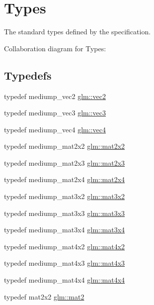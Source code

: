 \hypertarget{group__core__types}{}\section{Types}
\label{group__core__types}


The standard types defined by the specification.  


Collaboration diagram for Types\+:
\subsection*{Typedefs}
\begin{DoxyCompactItemize}
\item 
typedef mediump\+\_\+vec2 \hyperlink{group__core__types_ga66d091b759687504ab01365fbd33a1dd}{glm\+::vec2}
\item 
typedef mediump\+\_\+vec3 \hyperlink{group__core__types_gad45787527c6ff2bd6680867204eb0354}{glm\+::vec3}
\item 
typedef mediump\+\_\+vec4 \hyperlink{group__core__types_gae9c89157f980f7247cdee8bf55787035}{glm\+::vec4}
\item 
typedef mediump\+\_\+mat2x2 \hyperlink{group__core__types_gac35d9aae8d7beaceba6d18f6e26261a4}{glm\+::mat2x2}
\item 
typedef mediump\+\_\+mat2x3 \hyperlink{group__core__types_gad23070b803932f5f3c9d9c2fd4d64895}{glm\+::mat2x3}
\item 
typedef mediump\+\_\+mat2x4 \hyperlink{group__core__types_gaa78542b8bfa06cd48c53dcd0d0a00707}{glm\+::mat2x4}
\item 
typedef mediump\+\_\+mat3x2 \hyperlink{group__core__types_gae38fe62de819d214ac89f1f4df343844}{glm\+::mat3x2}
\item 
typedef mediump\+\_\+mat3x3 \hyperlink{group__core__types_gae01cfe70eb34df727346f82c7c08acd7}{glm\+::mat3x3}
\item 
typedef mediump\+\_\+mat3x4 \hyperlink{group__core__types_ga75499a515649f0db9593beb23ab084a5}{glm\+::mat3x4}
\item 
typedef mediump\+\_\+mat4x2 \hyperlink{group__core__types_gaf8b375fbef797b3730fcddc7bd60b59f}{glm\+::mat4x2}
\item 
typedef mediump\+\_\+mat4x3 \hyperlink{group__core__types_ga605b649496ad53379e8ac6d7a4534667}{glm\+::mat4x3}
\item 
typedef mediump\+\_\+mat4x4 \hyperlink{group__core__types_gafe3341c717b9f9725019a10fd1dcf9c1}{glm\+::mat4x4}
\item 
typedef mat2x2 \hyperlink{group__core__types_ga8357ec0aab6f8cf69313592492663c3f}{glm\+::mat2}

\end{DoxyCompactItemize}
